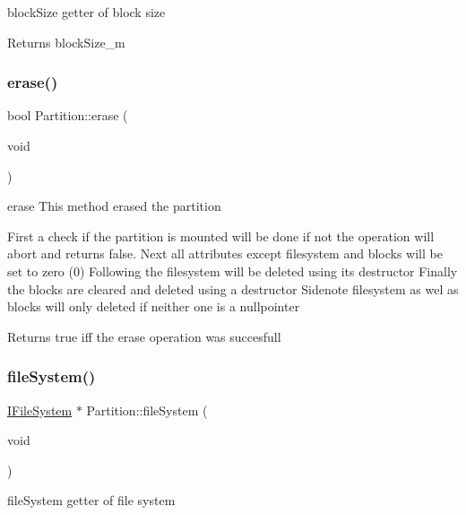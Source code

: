 block\+Size getter of block size 

\begin{DoxyReturn}{Returns}
block\+Size\+\_\+m 
\end{DoxyReturn}
\mbox{\label{classlogic_1_1_partition_a43ea90c84d2d9b90e665efbc06d5d626}} 
\subsubsection{\texorpdfstring{erase()}{erase()}}
{\footnotesize\ttfamily bool Partition\+::erase (\begin{DoxyParamCaption}\item[{void}]{ }\end{DoxyParamCaption})}



erase This method erased the partition 

First a check if the partition is mounted will be done if not the operation will abort and returns false. Next all attributes except filesystem and blocks will be set to zero (0) Following the filesystem will be deleted using its destructor Finally the blocks are cleared and deleted using a destructor Sidenote filesystem as wel as blocks will only deleted if neither one is a nullpointer \begin{DoxyReturn}{Returns}
true iff the erase operation was succesfull 
\end{DoxyReturn}
\mbox{\label{classlogic_1_1_partition_a37dd86b3bc84bc1c7463beaf6d3adc57}} 
\subsubsection{\texorpdfstring{file\+System()}{fileSystem()}}
{\footnotesize\ttfamily \mbox{\hyperlink{class_i_file_system}{I\+File\+System}} $\ast$ Partition\+::file\+System (\begin{DoxyParamCaption}\item[{void}]{ }\end{DoxyParamCaption})}



file\+System getter of file system 

